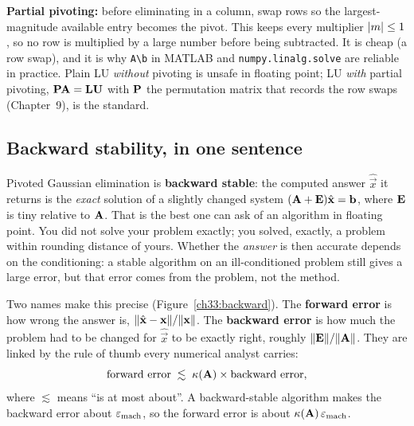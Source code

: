 \begin{focusbox}
\textbf{Partial pivoting:} before eliminating in a column, swap rows so the
largest-magnitude available entry becomes the pivot. This keeps every multiplier
$\lvert m\rvert\le 1$, so no row is multiplied by a large number before being subtracted. It
is cheap (a row swap), and it is why \texttt{A\textbackslash b} in MATLAB and
\texttt{numpy.linalg.solve} are reliable in practice. Plain LU \emph{without} pivoting
is unsafe in floating point; LU \emph{with} partial pivoting,
$\mathbf{P}\mathbf{A}=\mathbf{L}\mathbf{U}$ with $\mathbf{P}$ the permutation matrix that records the
row swaps (Chapter~9), is the standard.
\end{focusbox}

\subsection{Backward stability, in one sentence}

Pivoted Gaussian elimination is \textbf{backward stable}: the computed answer
$\hat{\vec{x}}$ it returns is the \emph{exact} solution of a slightly changed system
$(\mathbf{A}+\mathbf{E})\hat{\mathbf{x}} = \mathbf{b}$, where $\mathbf{E}$ is tiny relative to $\mathbf{A}$.
That is the best one can ask of an algorithm in floating point. You did not solve your
problem exactly; you solved, exactly, a problem within rounding distance of yours.
Whether the \emph{answer} is then accurate depends on the conditioning: a stable
algorithm on an ill-conditioned problem still gives a large error, but that error comes
from the problem, not the method.

Two names make this precise (Figure~\ref{ch33:backward}). The \textbf{forward error} is
how wrong the answer is, $\lVert\hat{\mathbf{x}}-\mathbf{x}\rVert/\lVert\mathbf{x}\rVert$. The
\textbf{backward error} is how much the problem had to be changed for $\hat{\vec{x}}$ to
be exactly right, roughly $\lVert\mathbf{E}\rVert/\lVert\mathbf{A}\rVert$. They are linked by the rule
of thumb every numerical analyst carries:
\[
  \text{forward error} \;\lesssim\; \kappa(\mathbf{A}) \times \text{backward error},
\]
where $\lesssim$ means ``is at most about''. A backward-stable algorithm makes the
backward error about $\varepsilon_{\text{mach}}$, so the forward error is about
$\kappa(\mathbf{A})\,\varepsilon_{\text{mach}}$.

